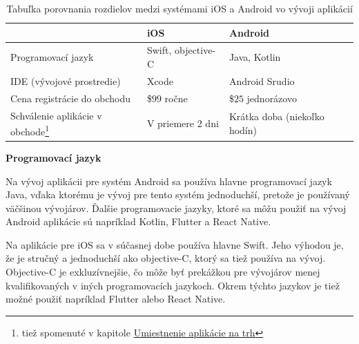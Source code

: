 \documentclass[10pt,twoside,slovak,a4paper]{article}
\begin{document}
\begin{savenotes}
\begin{table}[h!]
\begin{tabular}{|l|l|l|}
\hline
                               & iOS                & Android                      \\ \hline
Programovací jazyk             & Swift, objective-C & Java, Kotlin                 \\ \hline
IDE (vývojové prostredie)      & Xcode              & Android Srudio               \\ \hline
Cena registrácie do obchodu    & \$\begin{math}99\end{math} ročne         & \$\begin{math}25\end{math} jednorázovo             \\ \hline
Schválenie aplikácie v obchode\footnote{tiež spomenuté v kapitole \hyperref[sec:Umiestnenie aplikácie na trh]{Umiestnenie aplikácie na trh}} & V priemere 2 dni   & Krátka doba (niekoľko hodín) \\ \hline


\end{tabular}
\caption{Tabuľka porovnania rozdielov medzi systémami iOS a Android vo vývoji aplikácií}
\end{table}
\end{savenotes}

\textbf{Programovací jazyk}

Na vývoj aplikácii pre systém Android sa používa hlavne programovací jazyk Java, vďaka ktorému je vývoj pre tento systém jednoduchší, pretože je používaný väčšinou vývojárov. Ďalšie programovacie jazyky, ktoré sa môžu použiť na vývoj Android aplikácie sú napríklad Kotlin, Flutter a React Native.

Na aplikácie pre iOS sa v súčasnej dobe používa hlavne Swift. Jeho výhodou je, že je stručný a jednoduchší ako objective-C, ktorý sa tiež používa na vývoj. Objective-C je exkluzívnejšie, čo môže byť prekážkou pre vývojárov menej kvalifikovaných v iných programovacích jazykoch. Okrem týchto jazykov je tiež možné použiť napríklad Flutter alebo React Native.
\end{document}
